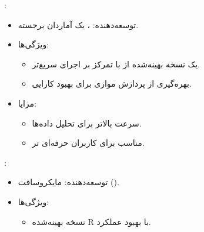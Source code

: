 \documentclass[11pt, a4paper, oneside]{book}
\newcounter{itemadded}
\let\LaTeXStandardEnumerateBegin\enumerate
\let\LaTeXStandardEnumerateEnd\endenumerate
\renewenvironment{enumerate}{%
	\LaTeXStandardEnumerateBegin%
	\setcounter{itemadded}{0}
}{%
	\LaTeXStandardEnumerateEnd%
}%
\begin{document}
\begin{enumerate}
\begin{itemize}
\begin{itemize}
					\end{itemize}
					
				\end{itemize}
				
				
				\item {\large {}}:
				
				\begin{itemize}
					
					\item  {\large توسعه‌دهنده}:
					{\normalsize {}، یک آماردان برجسته.}
					
					\item {\large ویژگی‌ها}:
					
					\begin{itemize}
						
						\item یک نسخه بهینه‌شده از  با تمرکز بر اجرای سریع‌تر.
						
						\item بهره‌گیری از پردازش موازی برای بهبود کارایی.
						
					\end{itemize}
					
					\item {\large مزایا}:
					
					\begin{itemize}
						
						\item سرعت بالاتر برای تحلیل داده‌ها.
						
						\item مناسب برای کاربران حرفه‌ای تر.
						
					\end{itemize}
					
				\end{itemize}
				
				
				\item {\large {}}:
				
				\begin{itemize}
					
					\item  {\large توسعه‌دهنده}:
					{\normalsize مایکروسافت ().}
					
					\item {\large ویژگی‌ها}:
					
					\begin{itemize}
						
						\item نسخه بهینه‌شده R با بهبود عملکرد.
						

\end{itemize}
\end{itemize}
\end{enumerate}
\end{document}
